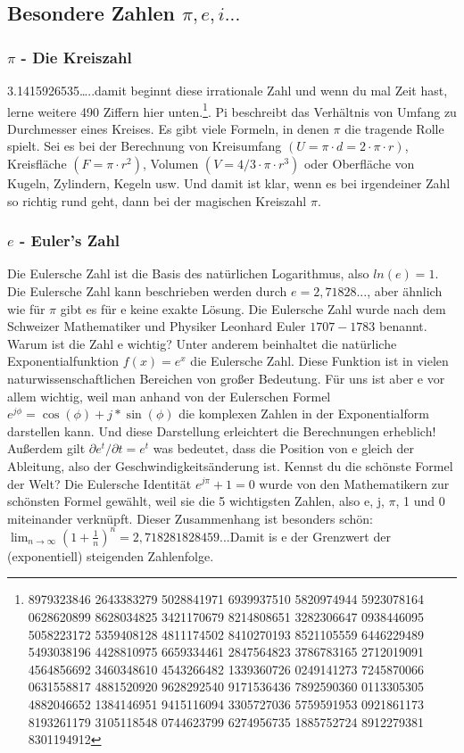 \documentclass[letterpaper, titlepage]{article}
\begin{document}
\subsection{Besondere Zahlen $\pi, e, i...$}\label{Besondere Zahlen}
\subsubsection{$\pi$ - Die Kreiszahl}\label{Die Kreiszahl}
3.1415926535\dots ..damit beginnt diese irrationale Zahl und wenn du mal Zeit hast, lerne weitere 490 Ziffern hier unten.\footnote{8979323846 2643383279 5028841971 6939937510 5820974944 5923078164 0628620899 8628034825 3421170679 8214808651 3282306647 0938446095 5058223172 5359408128 4811174502 8410270193 8521105559 6446229489 5493038196 4428810975 6659334461 2847564823 3786783165 2712019091 4564856692 3460348610 4543266482 1339360726 0249141273 7245870066 0631558817 4881520920 9628292540 9171536436 7892590360 0113305305 4882046652 1384146951 9415116094 3305727036 5759591953 0921861173 8193261179 3105118548 0744623799 6274956735 1885752724 8912279381 8301194912}. Pi beschreibt das Verhältnis von Umfang zu Durchmesser eines Kreises. Es gibt viele Formeln, in denen $\pi$ die tragende Rolle spielt. Sei es bei der Berechnung von Kreisumfang $(U = \pi·d = 2·\pi·r)$, Kreisfläche $(F = \pi·r^2)$, Volumen $(V = 4/3·\pi·r^3)$ oder Oberfläche von Kugeln, Zylindern, Kegeln usw. Und damit ist klar, wenn es bei irgendeiner Zahl so richtig rund geht, dann bei der magischen Kreiszahl $\pi$.
\subsubsection{$e$ - Euler's Zahl}\label{Euler's Zahl}
Die Eulersche Zahl ist die Basis des natürlichen Logarithmus, also $ln(e) = 1$. Die Eulersche Zahl kann beschrieben werden durch $e = 2,71828$..., aber ähnlich wie für $\pi$ gibt es für e keine exakte Lösung. Die Eulersche Zahl wurde nach dem Schweizer Mathematiker und Physiker Leonhard Euler \(1707-1783\) benannt. Warum ist die Zahl e wichtig? Unter anderem beinhaltet die natürliche Exponentialfunktion $f(x) = e^x$ die Eulersche Zahl.  Diese Funktion ist in vielen naturwissenschaftlichen Bereichen von großer Bedeutung. Für uns ist aber e vor allem wichtig, weil man anhand von der Eulerschen Formel $e^{j\phi}=\cos(\phi)+j*\sin(\phi)$ die komplexen Zahlen in der Exponentialform darstellen kann. Und diese Darstellung erleichtert die Berechnungen erheblich! Außerdem gilt $\partial e^t/\partial t=e^t$ was bedeutet, dass die Position von e gleich der Ableitung, also der Geschwindigkeitsänderung ist. Kennst du die schönste Formel der Welt? Die Eulersche Identität $e^{j\pi} + 1 = 0$ wurde von den Mathematikern zur schönsten Formel gewählt, weil sie die 5 wichtigsten Zahlen, also e, j, $\pi$, 1 und 0 miteinander verknüpft. Dieser Zusammenhang ist besonders schön: $\lim_{n \to \infty}\left(1+\frac{1}{n} \right)^n=2,718281828459...$Damit is e der Grenzwert der (exponentiell) steigenden Zahlenfolge.  
\end{document}
